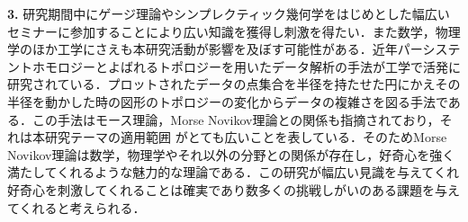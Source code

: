 \documentclass[11pt,a4j,dvipdfmx]{jarticle} 					%
\newcommand{\研究課題名}{象の卵}
\newcommand{\研究機関名}{京都大学}
\newcommand{\研究代表者氏名}{福士謙二}
\begin{document}
\noindent\textbf{3. }研究期間中にゲージ理論やシンプレクティック幾何学をはじめとした幅広いセミナーに参加することにより広い知識を獲得し刺激を得たい．また数学，物理学のほか工学にさえも本研究活動が影響を及ぼす可能性がある．近年パーシステントホモロジーとよばれるトポロジーを用いたデータ解析の手法が工学で活発に研究されている．プロットされたデータの点集合を半径を持たせた円にかえその半径を動かした時の図形のトポロジーの変化からデータの複雑さを図る手法である．この手法はモース理論，Morse Novikov理論との関係も指摘されており，それは本研究テーマの適用範囲
がとても広いことを表している．そのためMorse Novikov理論は数学，物理学やそれ以外の分野との関係が存在し，好奇心を強く満たしてくれるような魅力的な理論である．この研究が幅広い見識を与えてくれ好奇心を刺激してくれることは確実であり数多くの挑戦しがいのある課題を与えてくれると考えられる．







\end{document}
